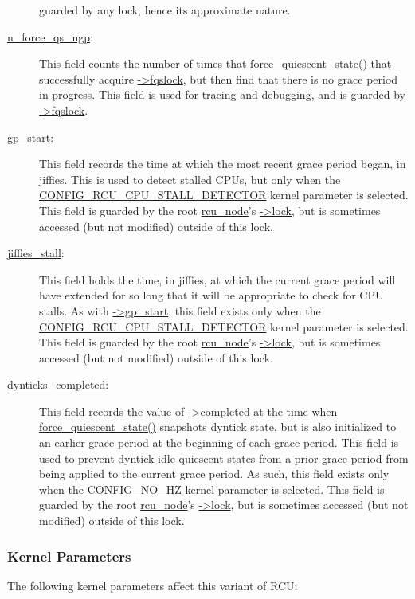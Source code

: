 \begin{description}
	guarded by any lock, hence its approximate nature.
\item[\url{n_force_qs_ngp}:]
	This field counts the number of times that
	\url{force_quiescent_state()} that successfully acquire
	\url{->fqslock}, but then find that there is no grace period
	in progress.
	This field is used for tracing and debugging, and
	is guarded by \url{->fqslock}.
\item[\url{gp_start}:]
	This field records the time at which the most recent grace period
	began, in jiffies.
	This is used to detect stalled CPUs, but only when the
	\url{CONFIG_RCU_CPU_STALL_DETECTOR} kernel parameter is selected.
	This field is guarded by the root \url{rcu_node}'s \url{->lock},
	but is sometimes accessed (but not modified) outside of this
	lock.
\item[\url{jiffies_stall}:]
	This field holds the time, in jiffies, at which the current
	grace period will have extended for so long that it will
	be appropriate to check for CPU stalls.
	As with \url{->gp_start}, this field exists only when the
	\url{CONFIG_RCU_CPU_STALL_DETECTOR} kernel parameter is selected.
	This field is guarded by the root \url{rcu_node}'s \url{->lock},
	but is sometimes accessed (but not modified) outside of this
	lock.
\item[\url{dynticks_completed}:]
	This field records the value of \url{->completed} at the time when
	\url{force_quiescent_state()} snapshots dyntick state, but
	is also initialized to an earlier grace period at the beginning
	of each grace period.
	This field is used to prevent dyntick-idle quiescent states
	from a prior grace period from being applied to the current
	grace period.
	As such, this field exists only when the \url{CONFIG_NO_HZ}
	kernel parameter is selected.
	This field is guarded by the root \url{rcu_node}'s \url{->lock},
	but is sometimes accessed (but not modified) outside of this
	lock.
\end{description}

\subsubsection{Kernel Parameters}
\label{app:rcuimpl:rcutreewt:Kernel Parameters}

The following kernel parameters affect this variant of RCU:

